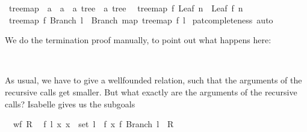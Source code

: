 \begin{isabellebody}
\ treemap\ {\isacharcolon}{\isacharcolon}\ {\isachardoublequoteopen}{\isacharparenleft}{\isacharprime}a\ {\isasymRightarrow}\ {\isacharprime}a{\isacharparenright}\ {\isasymRightarrow}\ {\isacharprime}a\ tree\ {\isasymRightarrow}\ {\isacharprime}a\ tree{\isachardoublequoteclose}\isanewline
{}\isanewline
\ \ {\isachardoublequoteopen}treemap\ f\ {\isacharparenleft}Leaf\ n{\isacharparenright}\ {\isacharequal}\ Leaf\ {\isacharparenleft}f\ n{\isacharparenright}{\isachardoublequoteclose}\isanewline
{\isacharbar}\ {\isachardoublequoteopen}treemap\ f\ {\isacharparenleft}Branch\ l{\isacharparenright}\ {\isacharequal}\ Branch\ {\isacharparenleft}map\ {\isacharparenleft}treemap\ f{\isacharparenright}\ l{\isacharparenright}{\isachardoublequoteclose}\isanewline
%
\isadelimproof
%
\endisadelimproof
%
\isatagproof
{}\isamarkupfalse%
\ pat{\isacharunderscore}completeness\ auto%
\endisatagproof
{\isafoldproof}%
%
\isadelimproof
%
\endisadelimproof
%
\begin{isamarkuptext}%
We do the termination proof manually, to point out what happens
  here:%
\end{isamarkuptext}%
\isamarkuptrue%
\isamarkupfalse%
%
\isadelimproof
\ %
\endisadelimproof
%
\isatagproof
{}\isamarkupfalse%
%
\begin{isamarkuptxt}%
As usual, we have to give a wellfounded relation, such that the
  arguments of the recursive calls get smaller. But what exactly are
  the arguments of the recursive calls? Isabelle gives us the
  subgoals

  \begin{isabelle}%
\ {}{\isachardot}\ wf\ {\isacharquery}R\isanewline
\ {}{\isachardot}\ {\isasymAnd}f\ l\ x{\isachardot}\ x\ {\isasymin}\ set\ l\ {\isasymLongrightarrow}\ {\isacharparenleft}{\isacharparenleft}f{\isacharcomma}\ x{\isacharparenright}{\isacharcomma}\ f{\isacharcomma}\ Branch\ l{\isacharparenright}\ {\isasymin}\ {\isacharquery}R%
\end{isabelle} 


\end{isamarkuptxt}
\end{isabellebody}
